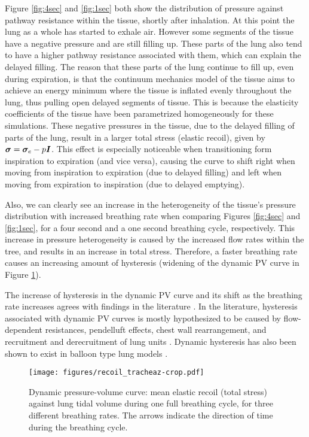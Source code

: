 Figure \ref{fig:4sec} and \ref{fig:1sec} both show the distribution of pressure against pathway resistance within the tissue, shortly after inhalation. At this point the lung as a whole has started to exhale air. However some segments of the tissue have a negative pressure and are still filling up. These parts of the lung also tend to have a higher pathway resistance associated with them, which can explain the delayed filling. The reason that these parts of the lung continue to fill up, even during expiration, is that the continuum mechanics model of the tissue aims to achieve an energy minimum where the tissue is inflated evenly throughout the lung, thus pulling open delayed segments of tissue. This is because the elasticity coefficients of the tissue have been parametrized homogeneously for these simulations. These negative pressures in the tissue, due to the delayed filling of parts of the lung, result in a larger total stress (elastic recoil), given by $\boldsymbol{\sigma}=\boldsymbol{\sigma}_{e}-p\boldsymbol{I}$. This effect is especially noticeable when transitioning form inspiration to expiration (and vice versa), causing the curve to shift right when moving from inspiration to expiration (due to delayed filling) and left when moving from expiration to inspiration (due to delayed emptying).


Also, we can clearly see an increase in the heterogeneity of the tissue's pressure distribution with increased breathing rate when comparing Figures \ref{fig:4sec} and \ref{fig:1sec}, for a four second and a one second breathing cycle, respectively. This increase in pressure heterogeneity is caused by the increased flow rates within the tree, and results in an increase in total stress. Therefore, a faster breathing rate causes an increasing amount of hysteresis (widening of the dynamic PV curve in Figure \ref{fig:recoil_trachea}).


The increase of hysteresis in the dynamic PV curve and its shift as the breathing rate increases agrees with findings in the literature \cite{rittner2005curves,harris2005pressure}. In the literature, hysteresis associated with dynamic PV curves is mostly hypothesized to be caused by flow-dependent resistances, pendelluft effects, chest wall rearrangement, and recruitment and derecruitment of lung
units \cite{albaiceta2008static,ranieri1994volume,harris2005pressure}. Dynamic hysteresis has also been shown to exist in balloon type lung models \cite{ismail2013coupled}.


\begin{figure}[H]
  \centering
   {\texttt{[image: figures/recoil\_tracheaz-crop.pdf]}} \caption{ Dynamic pressure-volume curve: mean elastic recoil (total stress) against lung tidal volume during one full breathing cycle, for three different breathing rates. The arrows indicate the direction of time during the breathing cycle.}
   \label{fig:recoil_trachea}
 \end{figure}

